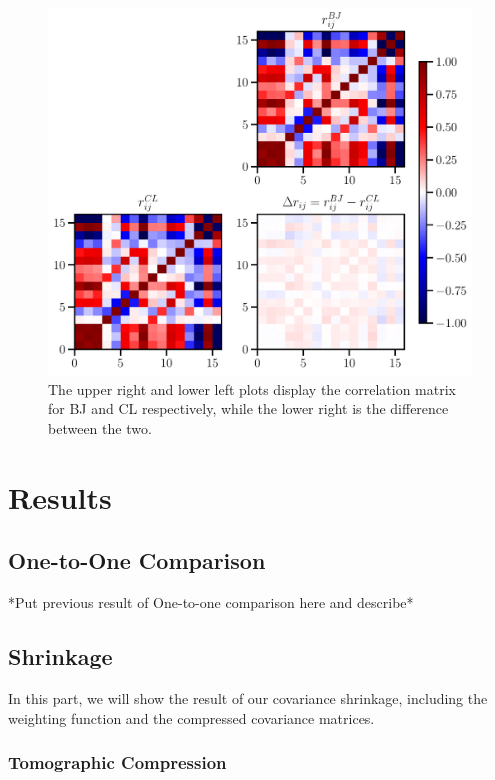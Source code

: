 \documentclass[twocolumn]{\docclass}
\begin{document}
\begin{figure}
\includegraphics[width=0.9\columnwidth]{Correlation_compression.pdf}
\caption{The upper right and lower left plots display the correlation matrix for BJ and CL respectively, while the lower right is the difference between the two. \label{fig:correlation}}
\end{figure}



\section{Results}
\label{sec:results}

\subsection{One-to-One Comparison}

*Put previous result of One-to-one comparison here and describe*

\subsection{Shrinkage}

In this part, we will show the result of our covariance shrinkage, including the weighting function and the compressed covariance matrices.

\subsubsection{Tomographic Compression}
\end{document}
